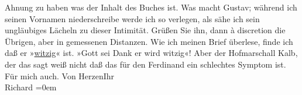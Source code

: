 \begin{ledgroupsized}[t]{13cm}
               Ahnung zu haben was der Inhalt des Buches ist. Was macht Gustav; während
               ich seinen Vornamen niederschreibe werde ich so verlegen, als sähe ich sein
               ungläubiges Lächeln zu dieser Intimität. Grüßen Sie ihn, dann à discretion die
               Übrigen, aber in gemessenen Distanzen.\pend
           \pstart
           Wie ich meinen Brief überlese, finde ich daß er »\uline{witzig}« ist. »Gott sei
                  Dank er wird witzig«! Aber der Hofmarschall Kalb, der das sagt weiß nicht daß das für den Ferdinand ein schlechtes
               Symptom ist. Für mich auch.\pend
           \pstart
           Von Herzen\hspace*{1.5em}Ihr{\\[\baselineskip]}\spacefill\mbox{Richard}\pend
           \leftskip=0em{}
         
         \endnumbering{}\end{ledgroupsized}  \newcommand{\dateiname}{L01016}\newcommand{\titel}{Richard Beer-Hofmann an Arthur Schnitzler, 22. 2. 1900}\newcommand{\editorInnen}{Martin Anton Müller und Gerd-Hermann Susen}
      